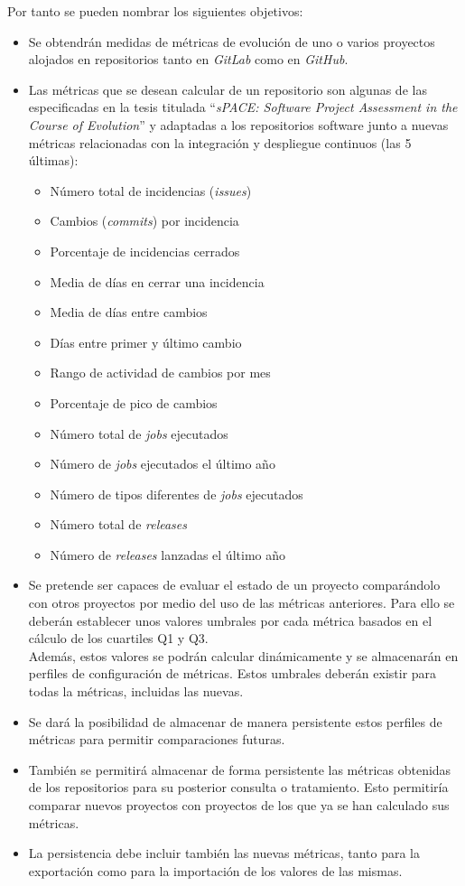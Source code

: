 Por tanto se pueden nombrar los siguientes objetivos:
\begin{itemize}
	\tightlist
	\item Se obtendrán medidas de métricas de evolución de uno o varios proyectos alojados en repositorios tanto en \textit{GitLab} como en \textit{GitHub}.
	\item Las métricas que se desean calcular de un repositorio  son algunas de las especificadas en la tesis titulada ``\textit{sPACE: Software Project Assessment in the Course of Evolution}'' \cite{ratzinger_space:_2007} y 
	adaptadas a los repositorios software junto a nuevas métricas relacionadas con la integración y despliegue continuos (las 5 últimas):
	\begin{itemize}
		\tightlist
		\item Número total de incidencias (\textit{issues})
		\item Cambios (\textit{commits}) por incidencia
		\item Porcentaje de incidencias cerrados
		\item Media de días en cerrar una incidencia
		\item Media de días entre cambios
		\item Días entre primer y último cambio
		\item Rango de actividad de cambios por mes
		\item Porcentaje de pico de cambios
		\item Número total de \textit{jobs} ejecutados
		\item Número de \textit{jobs} ejecutados el último año
		\item Número de tipos diferentes de \textit{jobs} ejecutados
		\item Número total de \textit{releases}
		\item Número de \textit{releases} lanzadas el último año
		
	\end{itemize}
	\item Se pretende ser capaces de evaluar el estado de un proyecto comparándolo con otros proyectos por medio del uso de las métricas anteriores. Para ello se deberán establecer unos valores umbrales por cada métrica basados en el cálculo de los cuartiles Q1 y Q3.\\
	 Además, estos valores se podrán calcular dinámicamente y se almacenarán en perfiles de configuración de métricas. Estos umbrales deberán existir para todas la métricas, incluidas las nuevas.
	\item Se dará la posibilidad de almacenar de manera persistente estos perfiles de métricas para permitir comparaciones futuras. 
	\item También se permitirá almacenar de forma persistente las métricas obtenidas de los repositorios para su posterior consulta o tratamiento. Esto permitiría comparar nuevos proyectos con proyectos de los que ya se han calculado sus métricas.
	\item La persistencia debe incluir también las nuevas métricas, tanto para la exportación como para la importación de los valores de las mismas.
\end{itemize}

